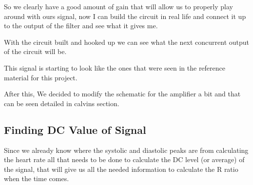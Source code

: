 \documentclass{article}
\begin{document}
So we clearly have a good amount of gain that will allow us to properly play around with ours signal, now I can build the circuit in real life and connect it up to the output of the filter and see what it gives me.
\begin{center}
\end{center}
With the circuit built and hooked up we can see what the next concurrent output of the circuit will be.
\begin{center}
\end{center}
This signal is starting to look like the ones that were seen in the reference material for this project.

After this, We decided to modify the schematic for the amplifier a bit and that can be seen detailed in calvins section.
\newpage
\subsection{Finding DC Value of Signal}

Since we already know where the systolic and diastolic peaks are from calculating the heart rate all that needs to be done to calculate the DC level (or average) of the signal, that will give us all the needed information to calculate the R ratio when the time comes.
\end{document}
